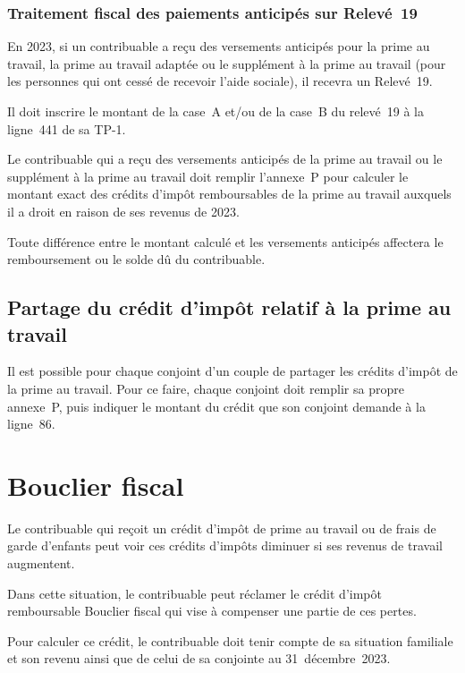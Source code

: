 \subsubsection{Traitement fiscal des paiements anticipés sur Relevé~19}
En 2023, si un contribuable a reçu des versements anticipés pour la prime au travail, la prime au travail adaptée ou le supplément à la prime au travail (pour les personnes qui ont cessé de recevoir l'aide sociale), il recevra un Relevé~19.

Il doit inscrire le montant de la case~A et/ou de la case~B du relevé~19 à la ligne~441 de sa TP-1.

Le contribuable qui a reçu des versements anticipés de la prime au travail ou le supplément à la prime au travail doit remplir l'annexe~P pour calculer le montant exact des crédits d'impôt remboursables de la prime au travail auxquels il a droit en raison de ses revenus de 2023.

Toute différence entre le montant calculé et les versements anticipés affectera le remboursement ou le solde dû du contribuable.

\subsection{Partage du crédit d'impôt relatif à la prime au travail}
Il est possible pour chaque conjoint d'un couple de partager les crédits d'impôt de la prime au travail. Pour ce faire, chaque conjoint doit remplir sa propre annexe~P, puis indiquer le montant du crédit que son conjoint demande à la ligne~86.




\section{Bouclier fiscal}
\begin{intro}
	Le contribuable qui reçoit un crédit d'impôt de prime au travail ou de frais de garde d'enfants peut voir ces crédits d'impôts diminuer si ses revenus de travail augmentent.
	
	Dans cette situation, le contribuable peut réclamer le crédit d'impôt remboursable \og Bouclier fiscal \fg{} qui vise à compenser une partie de ces pertes.
\end{intro}
Pour calculer ce crédit, le contribuable doit tenir compte de sa situation familiale et son revenu ainsi que de celui de sa conjointe au 31~décembre~2023.

